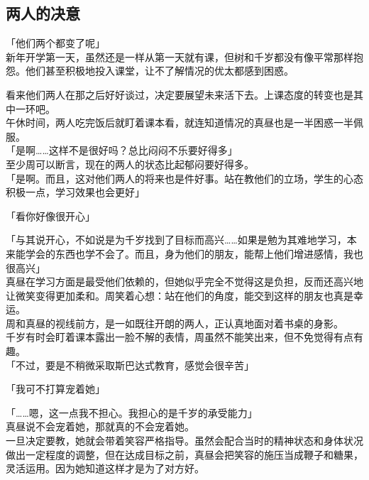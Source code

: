 \subsection{两人的决意}

「他们两个都变了呢」\\

新年开学第一天，虽然还是一样从第一天就有课，但树和千岁都没有像平常那样抱怨。他们甚至积极地投入课堂，让不了解情况的优太都感到困惑。

看来他们两人在那之后好好谈过，决定要展望未来活下去。上课态度的转变也是其中一环吧。\\

午休时间，两人吃完饭后就盯着课本看，就连知道情况的真昼也是一半困惑一半佩服。\\

「是啊……这样不是很好吗？总比闷闷不乐要好得多」\\

至少周可以断言，现在的两人的状态比起郁闷要好得多。\\

「是啊。而且，这对他们两人的将来也是件好事。站在教他们的立场，学生的心态积极一点，学习效果也会更好」

「看你好像很开心」

「与其说开心，不如说是为千岁找到了目标而高兴……如果是勉为其难地学习，本来能学会的东西也学不会了。而且，身为他们的朋友，能帮上他们增进感情，我也很高兴」\\

真昼在学习方面是最受他们依赖的，但她似乎完全不觉得这是负担，反而还高兴地让微笑变得更加柔和。周笑着心想：站在他们的角度，能交到这样的朋友也真是幸运。\\

周和真昼的视线前方，是一如既往开朗的两人，正认真地面对着书桌的身影。\\

千岁有时会盯着课本露出一脸不解的表情，周虽然不能笑出来，但不免觉得有点有趣。\\

「不过，要是不稍微采取斯巴达式教育，感觉会很辛苦」

「我可不打算宠着她」

「……嗯，这一点我不担心。我担心的是千岁的承受能力」\\

真昼说不会宠着她，那就真的不会宠着她。\\

一旦决定要教，她就会带着笑容严格指导。虽然会配合当时的精神状态和身体状况做出一定程度的调整，但在达成目标之前，真昼会把笑容的施压当成鞭子和糖果，灵活运用。因为她知道这样才是为了对方好。\\

